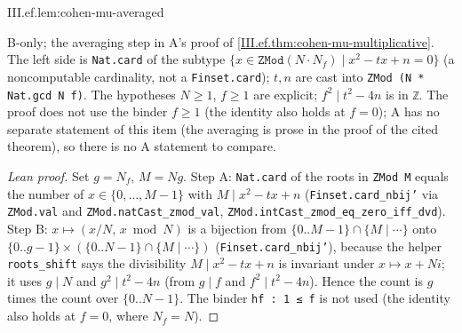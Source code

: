 \begin{lemma}
\bonly
{}
\end{lemma}
\begin{tfformal}{III.ef.lem:cohen-mu-averaged}
\begin{tffidelity}
B-only; the averaging step in A's proof of \cref{III.ef.thm:cohen-mu-multiplicative}. The left side is \texttt{Nat.card} of the subtype $\{x\in\texttt{ZMod}(N\cdot N_f)\mid x^2-tx+n=0\}$ (a noncomputable cardinality, not a \texttt{Finset.card}); $t,n$ are cast into \texttt{ZMod (N * Nat.gcd N f)}. The hypotheses $N\ge1$, $f\ge1$ are explicit; $f^2\mid t^2-4n$ is in \texttt{ℤ}. The proof does not use the binder $f\ge1$ (the identity also holds at $f=0$); A has no separate statement of this item (the averaging is prose in the proof of the cited theorem), so there is no A statement to compare.
\end{tffidelity}
\end{tfformal}
\begin{proof}[Lean proof]
Set $g=N_f$, $M=Ng$. Step A: \texttt{Nat.card} of the roots in \texttt{ZMod M} equals the number of $x\in\{0,\dots,M-1\}$ with $M\mid x^2-tx+n$ (\texttt{Finset.card\_nbij'} via \texttt{ZMod.val} and \texttt{ZMod.natCast\_zmod\_val}, \texttt{ZMod.intCast\_zmod\_eq\_zero\_iff\_dvd}). Step B: $x\mapsto(x/N,\,x\bmod N)$ is a bijection from $\{0..M-1\}\cap\{M\mid\cdots\}$ onto $\{0..g-1\}\times(\{0..N-1\}\cap\{M\mid\cdots\})$ (\texttt{Finset.card\_nbij'}), because the helper \texttt{roots\_shift} says the divisibility $M\mid x^2-tx+n$ is invariant under $x\mapsto x+Ni$; it uses $g\mid N$ and $g^2\mid t^2-4n$ (from $g\mid f$ and $f^2\mid t^2-4n$). Hence the count is $g$ times the count over $\{0..N-1\}$. The binder \texttt{hf : 1 ≤ f} is not used (the identity also holds at $f=0$, where $N_f=N$).
\end{proof}

